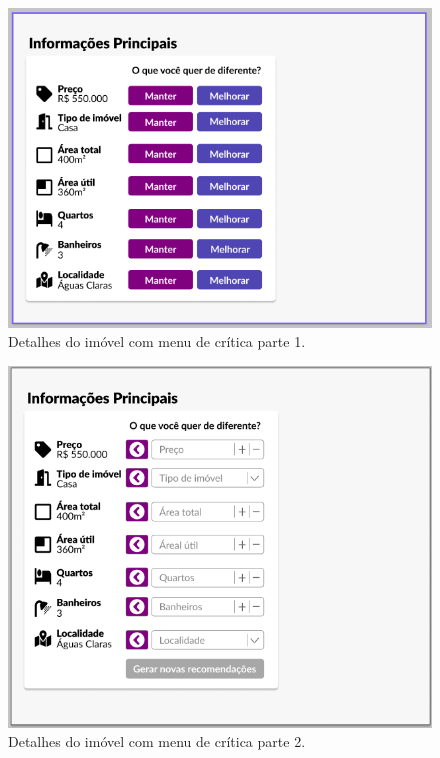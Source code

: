 \begin{figure}[H]
    \centering
    \includegraphics[scale=0.7]{figuras/proposta/prototipo_critico1.png}
    \caption[Detalhes do imóvel com menu de crítica parte 1]{Detalhes do imóvel com menu de crítica parte 1.}
    \label{fig:prototipo_critico1}
\end{figure}

\begin{figure}[H]
    \centering
    \includegraphics[scale=0.8]{figuras/proposta/prototipo_critico2.png}
    \caption[Detalhes do imóvel com menu de crítica parte 2]{Detalhes do imóvel com menu de crítica parte 2.}
    \label{fig:prototipo_critico2}
\end{figure}

